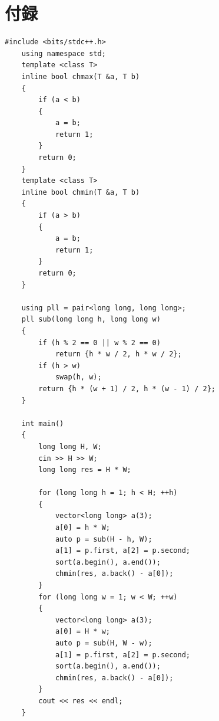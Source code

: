 \documentclass[12pt]{jarticle}
\begin{document}
\appendix
\section{付録}
\begin{lstlisting}[style = lstcpp,caption=saiteki.cpp]
    #include <bits/stdc++.h>
    using namespace std;
    template <class T>
    inline bool chmax(T &a, T b)
    {
        if (a < b)
        {
            a = b;
            return 1;
        }
        return 0;
    }
    template <class T>
    inline bool chmin(T &a, T b)
    {
        if (a > b)
        {
            a = b;
            return 1;
        }
        return 0;
    }
    
    using pll = pair<long long, long long>;
    pll sub(long long h, long long w)
    {
        if (h % 2 == 0 || w % 2 == 0)
            return {h * w / 2, h * w / 2};
        if (h > w)
            swap(h, w);
        return {h * (w + 1) / 2, h * (w - 1) / 2};
    }
    
    int main()
    {
        long long H, W;
        cin >> H >> W;
        long long res = H * W;
    
        for (long long h = 1; h < H; ++h)
        {
            vector<long long> a(3);
            a[0] = h * W;
            auto p = sub(H - h, W);
            a[1] = p.first, a[2] = p.second;
            sort(a.begin(), a.end());
            chmin(res, a.back() - a[0]);
        }
        for (long long w = 1; w < W; ++w)
        {
            vector<long long> a(3);
            a[0] = H * w;
            auto p = sub(H, W - w);
            a[1] = p.first, a[2] = p.second;
            sort(a.begin(), a.end());
            chmin(res, a.back() - a[0]);
        }
        cout << res << endl;
    }
\end{lstlisting}


\end{document}
